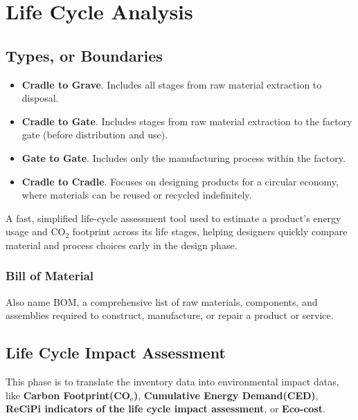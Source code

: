 \documentclass{NoteThesis/note-thesis}
\begin{document}
\section{Life Cycle Analysis}

\subsection{Types, or Boundaries}

\begin{itemize}
    \item \textbf{Cradle to Grave}. Includes all stages from raw material extraction to disposal.
    \item \textbf{Cradle to Gate}. Includes stages from raw material extraction to the factory gate (before distribution and use).
    \item \textbf{Gate to Gate}. Includes only the manufacturing process within the factory.
    \item \textbf{Cradle to Cradle}. Focuses on designing products for a circular economy, where materials can be reused or recycled indefinitely.
\end{itemize}

\begin{mynote_env}[frametitle={Eco-Audit}]
    A fast, simplified life-cycle assessment tool used to estimate a product's energy usage and CO$_2$ footprint across its life stages, helping designers quickly compare material and process choices early in the design phase.
\end{mynote_env}

\subsubsection*{Bill of Material}

Also name BOM, a comprehensive list of raw materials, components, and assemblies required to construct, manufacture, or repair a product or service.

\subsection{Life Cycle Impact Assessment}

This phase is to translate the inventory data into environmental impact datas, like \textbf{Carbon Footprint(CO$_{\text{e}}$)}, \textbf{Cumulative Energy Demand(CED)}, \textbf{ReCiPi indicators of the life cycle impact assessment}, or \textbf{Eco-cost}.
\end{document}
